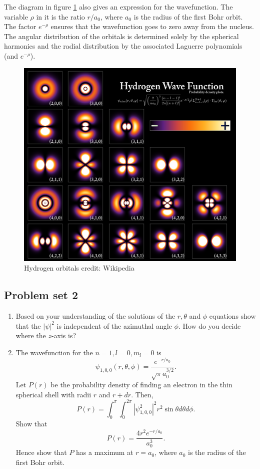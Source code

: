 The diagram in figure \ref{c6f1} also gives an expression for the wavefunction.
The variable $\rho$ in it is the ratio $r/a_0$, where $a_0$ is the radius of the
first Bohr orbit. The factor $e^{-\rho}$ ensures that the wavefunction goes to
zero away from the nucleus. The angular distribution of the orbitals is 
determined solely by the spherical harmonics and the radial distribution by the
associated Laguerre polynomials (and $e^{-\rho}$).
\begin{figure}
\begin{center}
\includegraphics[scale=0.20]{Hydrogen_Density_Plots}
\caption{Hydrogen orbitals credit: Wikipedia}
\label{c6f1}
\end{center}
\end{figure}

\subsection{Problem set 2}
\begin{enumerate}
\item Based on your understanding of the solutions of the $r, \theta$ and 
$\phi$ equations show that the $|\psi|^2$ is independent of the azimuthal angle
$\phi$. How do you decide where the $z$-axis is?
\item The wavefunction for the $n=1, l=0, m_l=0$ is
\begin{equation}\label{c6s3e6}
\psi_{1,0,0}(r,\theta,\phi) = \frac{e^{-r/a_0}}{\sqrt{\pi}a_0^{3/2}}.
\end{equation}
Let $P(r)$ be the probability density of finding an electron in the thin 
spherical shell with radii $r$ and $r + dr$. Then,
\begin{equation}\label{c6s3e7}
P(r) = \int_0^{\pi}\int_0^{2\pi}|\psi_{1,0,0}^2|^2r^2\sin\theta d\theta d\phi.
\end{equation}
Show that
\begin{equation}\label{c6s3e8}
P(r) = \frac{4r^2 e^{-r/a_0}}{a_0^3}.
\end{equation}
Hence show that $P$ has a maximum at $r = a_0$, where $a_0$ is the radius of the
first Bohr orbit.
\end{enumerate}
